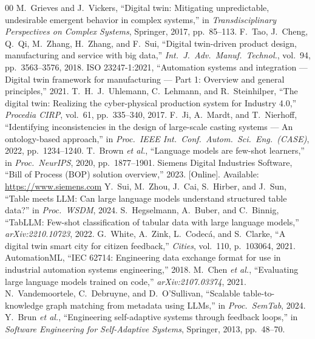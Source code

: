 \begin{thebibliography}{00}
 M.~Grieves and J.~Vickers, ``Digital twin: Mitigating unpredictable, undesirable emergent behavior in complex systems,'' in \textit{Transdisciplinary Perspectives on Complex Systems}, Springer, 2017, pp.~85--113.
 F.~Tao, J.~Cheng, Q.~Qi, M.~Zhang, H.~Zhang, and F.~Sui, ``Digital twin-driven product design, manufacturing and service with big data,'' \textit{Int.\ J.\ Adv.\ Manuf.\ Technol.}, vol.~94, pp.~3563--3576, 2018.
 ISO 23247-1:2021, ``Automation systems and integration --- Digital twin framework for manufacturing --- Part 1: Overview and general principles,'' 2021.
 T.~H.~J.~Uhlemann, C.~Lehmann, and R.~Steinhilper, ``The digital twin: Realizing the cyber-physical production system for Industry 4.0,'' \textit{Procedia CIRP}, vol.~61, pp.~335--340, 2017.
 F.~Ji, A.~Mardt, and T.~Nierhoff, ``Identifying inconsistencies in the design of large-scale casting systems --- An ontology-based approach,'' in \textit{Proc.\ IEEE Int.\ Conf.\ Autom.\ Sci.\ Eng.\ (CASE)}, 2022, pp.~1234--1240.
 T.~Brown \textit{et al.}, ``Language models are few-shot learners,'' in \textit{Proc.\ NeurIPS}, 2020, pp.~1877--1901.
 Siemens Digital Industries Software, ``Bill of Process (BOP) solution overview,'' 2023. [Online]. Available: \url{https://www.siemens.com}
 Y.~Sui, M.~Zhou, J.~Cai, S.~Hirber, and J.~Sun, ``Table meets LLM: Can large language models understand structured table data?'' in \textit{Proc.\ WSDM}, 2024.
 S.~Hegselmann, A.~Buber, and C.~Binnig, ``TabLLM: Few-shot classification of tabular data with large language models,'' \textit{arXiv:2210.10723}, 2022.
 G.~White, A.~Zink, L.~Codec\'{a}, and S.~Clarke, ``A digital twin smart city for citizen feedback,'' \textit{Cities}, vol.~110, p.~103064, 2021.
 AutomationML, ``IEC 62714: Engineering data exchange format for use in industrial automation systems engineering,'' 2018.
 M.~Chen \textit{et al.}, ``Evaluating large language models trained on code,'' \textit{arXiv:2107.03374}, 2021.
 N.~Vandemoortele, C.~Debruyne, and D.~O'Sullivan, ``Scalable table-to-knowledge graph matching from metadata using LLMs,'' in \textit{Proc.\ SemTab}, 2024.
 Y.~Brun \textit{et al.}, ``Engineering self-adaptive systems through feedback loops,'' in \textit{Software Engineering for Self-Adaptive Systems}, Springer, 2013, pp.~48--70.

\end{thebibliography}
